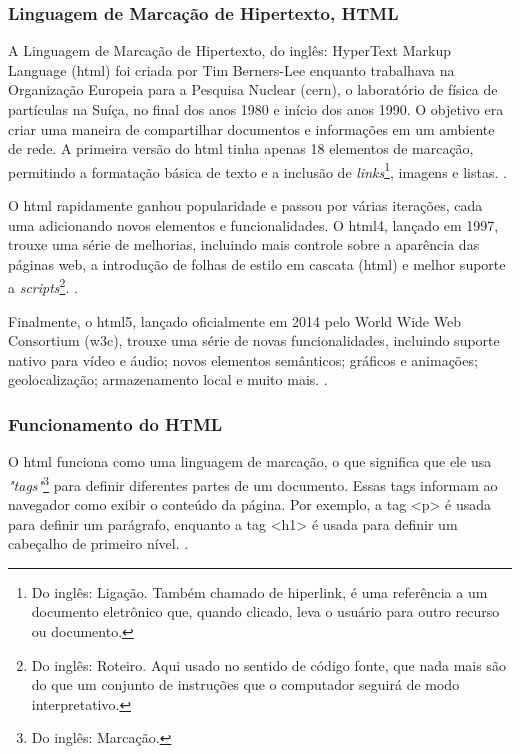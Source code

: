 \subsubsection{Linguagem de Marcação de Hipertexto, HTML}

A Linguagem de Marcação de Hipertexto, do inglês: HyperText Markup Language
(\acrshort{html})
foi criada por Tim Berners-Lee enquanto trabalhava na Organização Europeia para a
Pesquisa Nuclear
(\acrshort{cern}),
o laboratório de física de partículas na Suíça, no final dos anos
1980 e início dos anos 1990. O objetivo era criar uma maneira de compartilhar documentos e
informações em um ambiente de rede. A primeira versão do
\acrshort{html}
tinha apenas 18 elementos
de marcação, permitindo a formatação básica de texto e a inclusão de
\textit{links}\footnote{Do inglês: Ligação. Também chamado de hiperlink, é uma referência a um
    documento eletrônico que, quando clicado, leva o usuário para outro recurso
    ou documento.
},
imagens e listas.
\cite{w3c}.

O
\acrshort{html}
rapidamente ganhou popularidade e passou por várias iterações, cada uma
adicionando novos elementos e funcionalidades. O
\acrshort{html}4,
lançado em 1997, trouxe uma
série de melhorias, incluindo mais controle sobre a aparência das páginas web, a introdução
de folhas de estilo em cascata
(\acrshort{html})
e melhor suporte a
\textit{scripts}\footnote{Do inglês: Roteiro. Aqui usado no sentido de código fonte, que nada mais são
    do que um conjunto de instruções que o computador seguirá de modo interpretativo.
}.
\cite{w3c}.

Finalmente, o
\acrshort{html}5,
lançado oficialmente em 2014 pelo World Wide Web
Consortium (\acrshort{w3c}), trouxe uma série de novas funcionalidades, incluindo suporte nativo para
vídeo e áudio; novos elementos semânticos; gráficos e animações; geolocalização;
armazenamento local e muito mais.
\cite{w3c}.

\subsubsection{Funcionamento do HTML}

O
\acrshort{html}
funciona como uma linguagem de marcação, o que significa que ele usa
\textit{"tags"}\footnote{Do inglês: Marcação.
}
para definir diferentes partes de um documento. Essas tags informam ao navegador
como exibir o conteúdo da página. Por exemplo, a tag
<p>
é usada para definir um parágrafo,
enquanto a tag
<h1>
é usada para definir um cabeçalho de primeiro nível.
\cite{w3c}.

